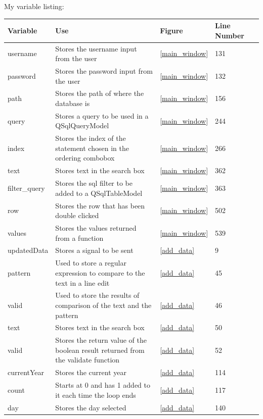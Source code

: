 My variable listing:

\begin{center}
	\begin{longtable}{|p{2cm}|p{2cm}|p{2cm}|p{2cm}|l}
		\hline
		\textbf{Variable}  &  \textbf{Use}  &  \textbf{Figure}  &  \textbf{Line Number} \\ \hline
		username & Stores the username input from the user & \ref{main_window} & 131 \\ \hline
		password & Stores the password input from the user &  \ref{main_window} & 132 \\ \hline
		path & Stores the path of where the database is & \ref{main_window} & 156 \\ \hline
		query & Stores a query to be used in a QSqlQueryModel & \ref{main_window} & 244 \\ \hline
		index & Stores the index of the statement chosen in the ordering combobox & \ref{main_window} & 266 \\ \hline
		text & Stores text in the search box & \ref{main_window} & 362 \\ \hline
		filter\_query & Stores the sql filter to be added to a QSqlTableModel & \ref{main_window} & 363 \\ \hline
		row & Stores the row that has been double clicked & \ref{main_window} & 502 \\ \hline
		values & Stores the values returned from a function & \ref{main_window} & 539 \\ \hline
		updatedData & Stores a signal to be sent & \ref{add_data} & 9 \\ \hline
		pattern & Used to store a regular expression to compare to the text in a line edit & \ref{add_data} & 45 \\ \hline
		valid & Used to store the results of comparison of the text and the pattern & \ref{add_data} & 46 \\ \hline
		text & Stores text in the search box & \ref{add_data} & 50 \\ \hline
		valid & Stores the return value of the boolean result returned from the validate function & \ref{add_data} & 52 \\ \hline
		currentYear & Stores the current year & \ref{add_data} & 114 \\ \hline
		count & Starts at 0 and has 1 added to it each time the loop ends & \ref{add_data} & 117 \\ \hline
		day & Stores the day selected & \ref{add_data} & 140 \\ \hline

\end{longtable}
\end{center}

